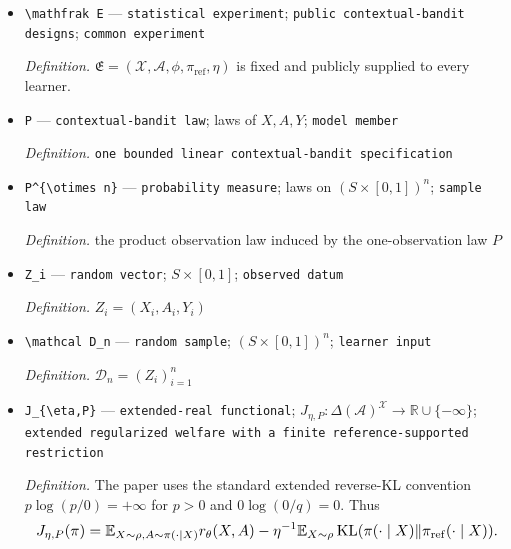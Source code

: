 \documentclass{article}
\begin{document}
\begin{itemize}
  \par\smallskip\noindent\emph{Definition.} \texttt{known reference and logging policy}
  \item \texttt{\textbackslash{}\allowbreak{}mathfrak E} --- \texttt{statistical experiment}; \texttt{public contextual-\allowbreak{}bandit designs}; \texttt{common experiment}
  \par\smallskip\noindent\emph{Definition.} \(\mathfrak E=(\mathcal X,\mathcal A,\phi,\pi_{\mathrm{ref}},\eta)\) is fixed and publicly supplied to every learner.
  \item \texttt{P} --- \texttt{contextual-\allowbreak{}bandit law}; laws of \(X,A,Y\); \texttt{model member}
  \par\smallskip\noindent\emph{Definition.} \texttt{one bounded linear contextual-\allowbreak{}bandit specification}
  \item \texttt{P\textasciicircum{}\{\textbackslash{}\allowbreak{}otimes n\}\allowbreak{}} --- \texttt{probability measure}; laws on \((S\times[0,1])^n\); \texttt{sample law}
  \par\smallskip\noindent\emph{Definition.} the product observation law induced by the one-observation law \(P\)
  \item \texttt{Z\_\allowbreak{}i} --- \texttt{random vector}; \(S\times[0,1]\); \texttt{observed datum}
  \par\smallskip\noindent\emph{Definition.} \(Z_i=(X_i,A_i,Y_i)\)
  \item \texttt{\textbackslash{}\allowbreak{}mathcal D\_\allowbreak{}n} --- \texttt{random sample}; \((S\times[0,1])^n\); \texttt{learner input}
  \par\smallskip\noindent\emph{Definition.} \(\mathcal D_n=(Z_i)_{i=1}^n\)
  \item \texttt{J\_\allowbreak{}\{\textbackslash{}\allowbreak{}eta,\allowbreak{}P\}\allowbreak{}} --- \texttt{extended-\allowbreak{}real functional}; \(J_{\eta,P}:\Delta(\mathcal A)^{\mathcal X}\to\mathbb R\cup\{-\infty\}\); \texttt{extended regularized welfare with a finite reference-\allowbreak{}supported restriction}
  \par\smallskip\noindent\emph{Definition.} The paper uses the standard extended reverse-KL convention \(p\log(p/0)=+\infty\) for \(p>0\) and \(0\log(0/q)=0\). Thus
\[
\makebox[\linewidth][c]{\resizebox{0.98\linewidth}{!}{\par\noindent \makebox[\linewidth][c]{\resizebox{0.98\linewidth}{!}{\(\displaystyle \displaystyle J_{\eta,P}(\pi)=\mathbb E_{X\sim\rho,A\sim\pi(\cdot\mid X)}r_\theta(X,A)-\eta^{-1}\mathbb E_{X\sim\rho}\operatorname{KL}(\pi(\cdot\mid X)\Vert\pi_{\mathrm{ref}}(\cdot\mid X)).\)}}\par\noindent}}
\]
\end{itemize}
\end{document}
